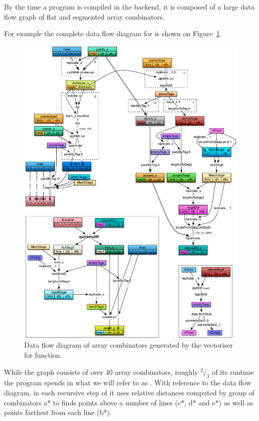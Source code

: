 \documentclass[preamble.tex]{subfiles}
\begin{document}
By the time a \DPH program is compiled in the backend, it is composed of a large data flow graph of flat and segmented array combinators.

For example the complete data flow diagram for \QuickHull is shown on Figure~\ref{fig:DFD-QuickHull}.


\begin{figure}
\includegraphics[width=1.1\textwidth, center]{img/DFD-QuickHull}
\caption{Data flow diagram of array combinators generated by the vectoriser for  function.}
\label{fig:DFD-QuickHull}
\end{figure}


While the graph consists of over 40 array combinators, roughly $^2/_3$ of its runtime the \QuickHull program spends in what we will refer to as . With reference to the data flow diagram, in each recursive step of \QuickHull it uses relative distances computed by group of combinators \*a* to finds points above a number of lines (\*c*, \*d* and \*e*) as well as points farthest from each line (\*b*).
\end{document}
